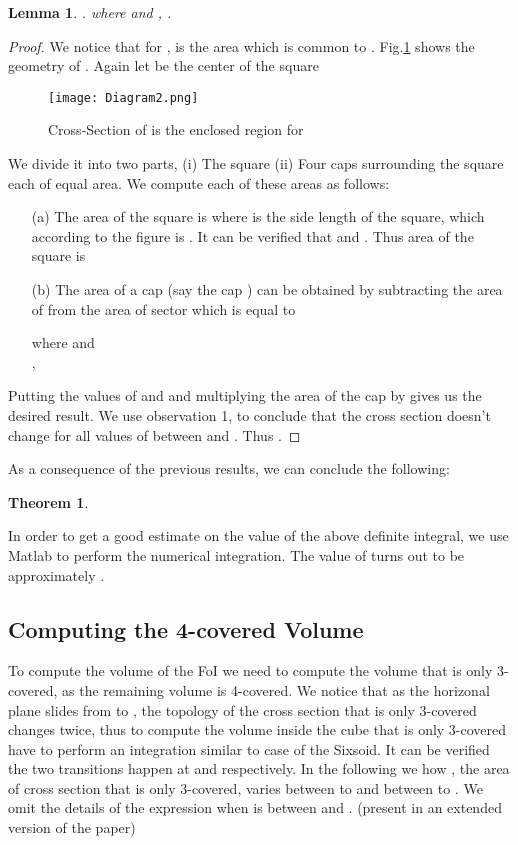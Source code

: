 \documentclass[conference]{IEEEtran}
\newtheorem{lemma}{Lemma}
\newtheorem{theorem}{Theorem}
\begin{document}
\begin{lemma}
.
where  and , .
\end{lemma}
\begin{proof}
We notice that for ,  is the area which is common to . Fig.\ref{z7} shows the geometry of . Again let  be the center of the square
\begin{figure}
\centering
\texttt{[image: Diagram2.png]}
\caption{Cross-Section of  is the enclosed region  for }
\label{z7}
\end{figure}
We divide it into two parts, (i) The square  (ii) Four caps surrounding the square each of equal area. We compute
each of these areas as follows:
\begin{itemize}
\item[(a)] The area of the square is  where  is the side length of the square, which according to the figure is . It
can be verified that  and . Thus area of the square is


\item[(b)] The area of a cap (say the cap ) can be obtained by subtracting the area of  from the area of sector 
which is equal to

where  and \\
 ,  

\end{itemize}
Putting the values of  and  and multiplying the area of the cap by  gives us the desired result.
We use observation 1, to conclude that the cross section doesn't change for all values  of  between 
and . Thus .
\end{proof}

As a consequence of the previous results, we can conclude the following:

\begin{theorem}


\end{theorem}

In order to get a good estimate on the value of the above definite integral, we use Matlab to perform the 
numerical integration. The value of  turns out to be approximately .

\subsection{Computing the 4-covered Volume}
To compute the volume of the FoI we need to compute the volume 
that is only 3-covered, as the remaining volume is 4-covered. We notice that as the
horizonal plane slides from  to , the topology of the
cross section that is only 3-covered changes twice, thus to compute the volume
inside the cube that is only 3-covered have to perform an integration similar to 
case of the Sixsoid. It can be verified the two transitions happen at 
and  respectively. In the following we how , the area of cross section that is only 3-covered,
varies between  to  and between  to .
We omit the details of the expression when  is between  and .
(present in an extended version of the paper)
 
\end{document}
